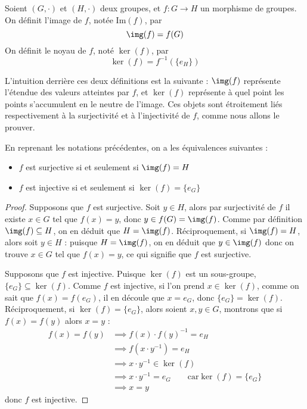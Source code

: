 \begin{defi}
    Soient $(G,\cdot)$ et $(H,\cdot)$ deux groupes, et $f : G\to H$ un morphisme de groupes. On définit l'image de $f$, notée $\mathrm{Im}(f)$, par $$\img(f) = f(G)$$ On définit le noyau de $f$, noté $\ker(f)$, par $$\ker(f) = f^{-1}(\{e_H\})$$
\end{defi}

L'intuition derrière ces deux définitions est la suivante : $\img(f)$ représente l'étendue des valeurs atteintes par $f$, et $\ker(f)$ représente à quel point les points s'accumulent en le neutre de l'image. Ces objets sont étroitement liés respectivement à la surjectivité et à l'injectivité de $f$, comme nous allons le prouver.

\begin{prop}
    En reprenant les notations précédentes, on a les équivalences suivantes :
    \begin{itemize}[label=$\bullet$]
        \item $f$ est surjective si et seulement si $\img(f) = H$
        \item $f$ est injective si et seulement si $\ker(f) = \{e_G\}$
    \end{itemize}
\end{prop}

\begin{proof}
    Supposons que $f$ est surjective. Soit $y\in H$, alors par surjectivité de $f$ il existe $x\in G$ tel que $f(x) = y$, donc $y\in f(G) = \img(f)$. Comme par définition $\img(f)\subseteq H$, on en déduit que $H = \img(f)$. Réciproquement, si $\img(f) = H$, alors soit $y\in H$ : puisque $H=\img(f)$, on en déduit que $y \in \img(f)$ donc on trouve $x\in G$ tel que $f(x) = y$, ce qui signifie que $f$ est surjective.

    Supposons que $f$ est injective. Puisque $\ker(f)$ est un sous-groupe, $\{e_G\}\subseteq \ker(f)$. Comme $f$ est injective, si l'on prend $x\in\ker(f)$, comme on sait que $f(x) = f(e_G)$, il en découle que $x = e_G$, donc $\{e_G\} = \ker(f)$. Réciproquement, si $\ker(f) = \{e_G\}$, alors soient $x,y\in G$, montrons que si $f(x) = f(y)$ alors $x=y$ :
    \begin{align*}
        f(x) = f(y) &\implies f(x)\cdot f(y)^{-1} = e_H\\
        &\implies f(x\cdot y^{-1}) = e_H\\
        &\implies x\cdot y^{-1} \in \ker(f)\\
        &\implies x\cdot y^{-1} = e_G \qquad \text{car} \ker(f) = \{e_G\}\\
        &\implies x = y
    \end{align*}
    donc $f$ est injective.
\end{proof}

